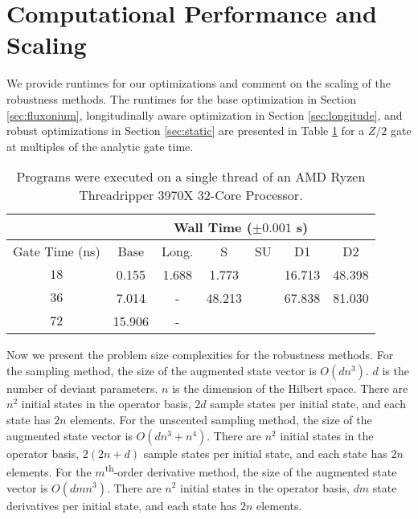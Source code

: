 \section{Computational Performance and Scaling \label{appendix:time}}
We provide runtimes for our optimizations and comment on the scaling of the
robustness methods. The runtimes for the base optimization in Section \ref{sec:fluxonium},
longitudinally aware optimization in Section \ref{sec:longitude},
and robust optimizations in Section \ref{sec:static} are presented
in Table \ref{tab:time} for a $Z/2$ gate at multiples
of the analytic gate time.

\begin{table}[ht]
  \begin{tabular} {c | c | c | c | c | c | c}
    & \multicolumn{6}{c}{Wall Time ($\pm 0.001$ s)}\\
    \hline
    Gate Time (ns) & Base & Long. & S & SU & D1 & D2\\
    \hline
    $18$ & 0.155 & 1.688 & 1.773 & & 16.713 & 48.398\\ %
    $36$ & 7.014 & - & 48.213 & & 67.838 & 81.030\\
    $72$ & 15.906 & - & & & &\\
  \end{tabular}
  \caption{Programs were executed on a single thread of an AMD Ryzen Threadripper 3970X 32-Core Processor.}
  \label{tab:time}
\end{table}

Now we present the problem size complexities for the robustness methods.
For the sampling method, the size of the augmented state vector
is $O(dn^{3})$. $d$ is the number of deviant parameters.
$n$ is the dimension of the Hilbert space. There are $n^{2}$ initial states
in the operator basis, $2d$ sample states per initial state,
and each state has $2n$ elements.
For the unscented sampling method, the size of the augmented state vector
is $O(dn^{3} + n^{4})$.
There are $n^{2}$ initial states in the operator basis,
$2(2n + d)$ sample states per initial state,
and each state has $2n$ elements.
For the $m$\textsuperscript{th}-order derivative method, the size of the augmented state vector
is $O(dmn^{3})$. There are $n^{2}$
initial states in the operator basis, $dm$ state derivatives per initial state,
and each state has $2n$ elements.
